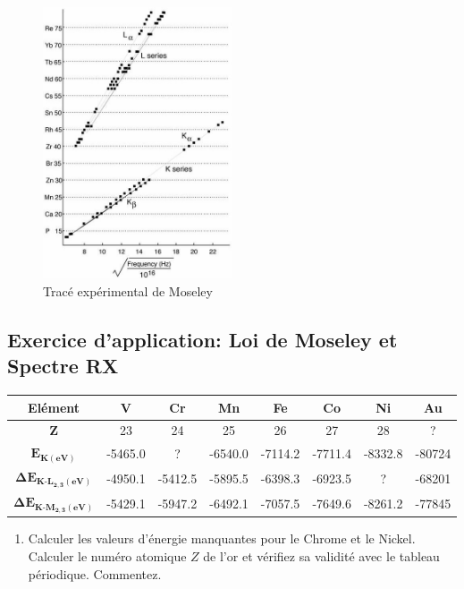 \documentclass{article}
\begin{document}
\begin{figure}[ht]
    \centering
    \includegraphics[width=0.5\textwidth]{Fig/Moseley.jpg}
    \caption{Tracé expérimental de Moseley}
    \label{fig:Moseley}
\end{figure}


\clearpage

\subsection*{Exercice d'application: Loi de Moseley et Spectre RX}

\vspace{5mm}
\begin{tabular}{|c|c|c|c|c|c|c|c|}
    \hline
    \textbf{Elément} & \textbf{V} & \textbf{Cr} & \textbf{Mn} & \textbf{Fe} & \textbf{Co} & \textbf{Ni} & \textbf{Au} \\ \hline
    \textbf{Z} & 23 & 24 & 25 & 26 & 27 & 28 & ? \\ \hline
    $\bm{E_{K(eV)}}$ & -5465.0 & ? & -6540.0 & -7114.2 & -7711.4 & -8332.8 & -80724 \\ \hline
    $\bm{\Delta E_{K\text{-}L_{2,3}(eV)}}$ & -4950.1 & -5412.5 & -5895.5 & -6398.3 & -6923.5 & ? & -68201 \\ \hline
    $\bm{\Delta E_{K\text{-}M_{2,3}(eV)}}$ & -5429.1 & -5947.2 & -6492.1 & -7057.5 & -7649.6 & -8261.2 & -77845 \\ \hline
\end{tabular}
\vspace{5mm}
\begin{enumerate}
    \item Calculer les valeurs d'énergie manquantes pour le Chrome et le Nickel. Calculer le numéro atomique $Z$ de l'or et vérifiez sa validité avec le tableau périodique. Commentez.
\end{enumerate}
\end{document}
